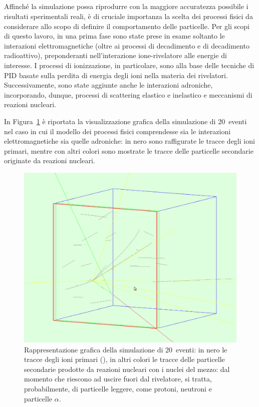 \subsection{}


Affinché la simulazione possa riprodurre con la maggiore accuratezza possibile i risultati sperimentali reali, è di cruciale importanza la scelta dei processi fisici da considerare allo scopo di definire il comportamento delle particelle.
Per gli scopi di questo lavoro, in una prima fase sono state prese in esame soltanto le interazioni elettromagnetiche (oltre ai processi di decadimento e di decadimento radioattivo), preponderanti nell'interazione ione-rivelatore alle energie di interesse.
I processi di ionizzazione, in particolare, sono alla base delle tecniche di PID basate sulla perdita di energia degli ioni nella materia dei rivelatori.
Successivamente, sono state aggiunte anche le interazioni adroniche, incorporando, dunque, processi di scattering elastico e inelastico e meccanismi di reazioni nucleari.

In Figura~\ref{fig:simulazione_evento} è riportata la visualizzazione grafica della simulazione di 20~eventi nel caso in cui il modello dei processi fisici comprendesse sia le interazioni elettromagnetiche sia quelle adroniche: in nero sono raffigurate le tracce degli ioni primari, mentre con altri colori sono mostrate le tracce delle particelle secondarie originate da reazioni nucleari. 



\begin{figure} [!p]
	\centering
	\includegraphics[width=\textwidth, keepaspectratio]{Grafici/evento5_ritagliato.png}
	\caption{Rappresentazione grafica della simulazione di 20~eventi: in nero le tracce degli ioni primari (), in altri colori le tracce delle particelle secondarie prodotte da reazioni nucleari con i nuclei del mezzo: dal momento che riescono ad uscire fuori dal rivelatore, si tratta, probabilmente, di particelle leggere, come protoni, neutroni e particelle $\alpha$.} \label{fig:simulazione_evento}
\end{figure}




